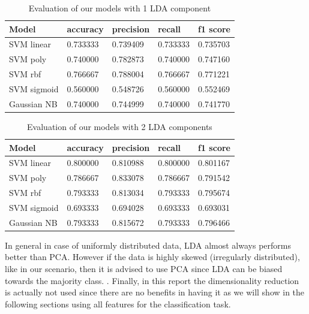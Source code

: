 \documentclass[a4paper,12pt]{article}
\begin{document}
\begin{table}[H]
\begin{tabular}{ |p{6cm}||p{2cm}|p{2cm}|p{2cm}|p{2cm}| }
  \hline
  Model& accuracy & precision  &  recall & f1 score \\
  \hline
  SVM linear           &0.733333&   0.739409&  0.733333&  0.735703\\
  SVM poly             &0.740000&   0.782873&  0.740000&  0.747160\\
  SVM rbf              &0.766667&   0.788004&  0.766667&  0.771221\\
  SVM sigmoid          &0.560000&   0.548726&  0.560000&  0.552469\\
  Gaussian NB          &0.740000&   0.744999&  0.740000&  0.741770\\
  \hline
\end{tabular}
\caption{Evaluation of our models with 1 LDA component}
\label{tab:lda1}
\end{table}

\begin{table}[H]
\begin{tabular}{ |p{6cm}||p{2cm}|p{2cm}|p{2cm}|p{2cm}| }
  \hline
  Model& accuracy & precision  &  recall & f1 score \\
  \hline
  SVM linear           &0.800000&   0.810988&  0.800000&  0.801167\\
  SVM poly             &0.786667&   0.833078&  0.786667&  0.791542\\
  SVM rbf              &0.793333&   0.813034&  0.793333&  0.795674\\
  SVM sigmoid          &0.693333&   0.694028&  0.693333&  0.693031\\
  Gaussian NB          &0.793333&   0.815672&  0.793333&  0.796466\\
  \hline
\end{tabular}
\caption{Evaluation of our models with 2 LDA components}
\label{tab:lda2}
\end{table}


\noindent In general in case of uniformly distributed data, LDA almost always performs better than PCA. However if the data is highly skewed (irregularly distributed), like in our scenario, then it is advised to use PCA since LDA can be biased towards the majority class. \cite{pca-lda}. Finally, in this report the dimensionality reduction is actually not used since there are no benefits in having it as we will show in the following sections using all features for the classification task.
\end{document}
